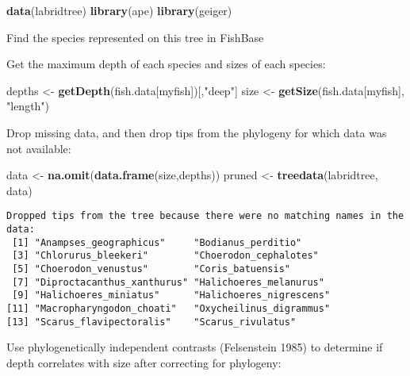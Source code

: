\documentclass[author-year]{elsarticle} %
\newenvironment{Shaded}{}{}
\newcommand{\KeywordTok}[1]{\textcolor[rgb]{0.00,0.44,0.13}{\textbf{{#1}}}}
\newcommand{\StringTok}[1]{\textcolor[rgb]{0.25,0.44,0.63}{{#1}}}
\newcommand{\NormalTok}[1]{{#1}}
\begin{document}
\begin{Shaded}
\begin{Highlighting}[]
\KeywordTok{data}\NormalTok{(labridtree)}
\KeywordTok{library}\NormalTok{(ape)}
\KeywordTok{library}\NormalTok{(geiger) }
\end{Highlighting}
\end{Shaded}
Find the species represented on this tree in FishBase

\begin{Shaded}
\end{Shaded}
Get the maximum depth of each species and sizes of each species:

\begin{Shaded}
\begin{Highlighting}[]
\NormalTok{depths <- }\KeywordTok{getDepth}\NormalTok{(fish.data[myfish])[,}\StringTok{"deep"}\NormalTok{]}
\NormalTok{size <- }\KeywordTok{getSize}\NormalTok{(fish.data[myfish], }\StringTok{"length"}\NormalTok{)}
\end{Highlighting}
\end{Shaded}
Drop missing data, and then drop tips from the phylogeny for which data
was not available:

\begin{Shaded}
\begin{Highlighting}[]
\NormalTok{data <- }\KeywordTok{na.omit}\NormalTok{(}\KeywordTok{data.frame}\NormalTok{(size,depths))}
\NormalTok{pruned <- }\KeywordTok{treedata}\NormalTok{(labridtree, data)}
\end{Highlighting}
\end{Shaded}
\begin{verbatim}
Dropped tips from the tree because there were no matching names in the data:
 [1] "Anampses_geographicus"     "Bodianus_perditio"        
 [3] "Chlorurus_bleekeri"        "Choerodon_cephalotes"     
 [5] "Choerodon_venustus"        "Coris_batuensis"          
 [7] "Diproctacanthus_xanthurus" "Halichoeres_melanurus"    
 [9] "Halichoeres_miniatus"      "Halichoeres_nigrescens"   
[11] "Macropharyngodon_choati"   "Oxycheilinus_digrammus"   
[13] "Scarus_flavipectoralis"    "Scarus_rivulatus"         
\end{verbatim}
Use phylogenetically independent contrasts (Felsenstein 1985) to
determine if depth correlates with size after correcting for phylogeny:
\end{document}
